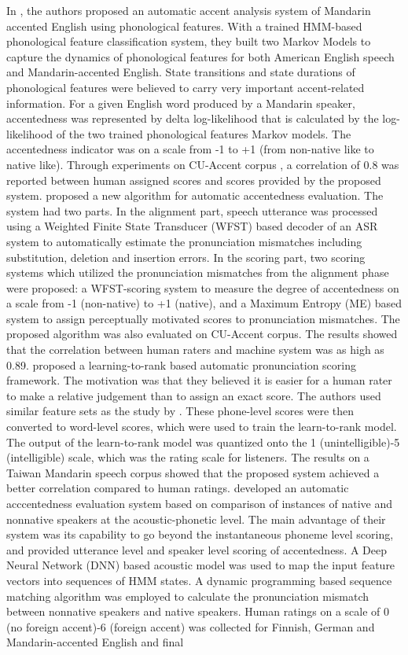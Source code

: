 In \cite{sangwan2012automatic}, the authors proposed an automatic accent analysis system of Mandarin accented English using phonological features. With a trained HMM-based phonological feature classification system, they built two Markov Models to capture the dynamics of phonological features for both American English speech and Mandarin-accented English. State transitions and state durations of phonological features were believed to carry very important accent-related information. For a given English word produced by a Mandarin speaker, accentedness was represented by delta log-likelihood that is calculated by the log-likelihood of the two trained phonological features Markov models. The accentedness indicator was on a scale from -1 to +1 (from non-native like to native like). Through experiments on CU-Accent corpus \citep{angkititrakul2006advances}, a correlation of 0.8 was reported between human assigned scores and scores provided by the proposed system. \cite{william2013automatic} proposed a new algorithm for automatic accentedness evaluation. The system had two parts. In the alignment part, speech utterance was processed using a Weighted Finite State Transducer (WFST) based decoder of an ASR system to automatically estimate the pronunciation mismatches including substitution, deletion and insertion errors. In the scoring part, two scoring systems which utilized the pronunciation mismatches from the alignment phase were proposed: a WFST-scoring system to measure the degree of accentedness on a scale from -1 (non-native) to +1 (native), and a Maximum Entropy (ME) based system to assign perceptually motivated scores to pronunciation mismatches. The proposed algorithm was also evaluated on CU-Accent corpus. The results showed that the correlation between human raters and machine system was as high as 0.89. \cite{chen2015automatic} proposed a learning-to-rank based automatic pronunciation scoring framework. The motivation was that they believed it is easier for a human rater to make a relative judgement than to assign an exact score. The authors used similar feature sets as the study by \cite{kim1997automatic}. These phone-level scores were then converted to word-level scores, which were used to train the learn-to-rank model. The output of the learn-to-rank model was quantized onto the 1 (unintelligible)-5 (intelligible) scale, which was the rating scale for listeners. The results on a Taiwan Mandarin speech corpus showed that the proposed system achieved a better correlation compared to human ratings. \cite{rasipuram2015automatic} developed an automatic acccentedness evaluation system based on comparison of instances of native and nonnative speakers at the acoustic-phonetic level. The main advantage of their system was its capability to go beyond the instantaneous phoneme level scoring, and provided utterance level and speaker level scoring of accentedness. A Deep Neural Network (DNN) based acoustic model was used to map the input feature vectors into sequences of HMM states. A dynamic programming based sequence matching algorithm was employed to calculate the pronunciation mismatch between nonnative speakers and native speakers. Human ratings on a scale of 0 (no foreign accent)-6 (foreign accent) was collected for Finnish, German and Mandarin-accented English and final 
